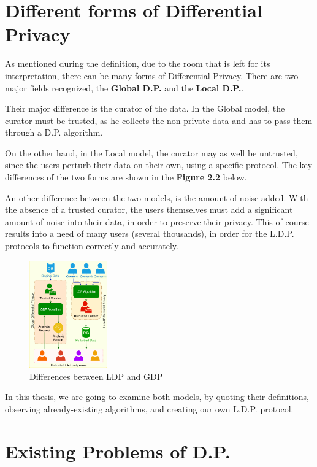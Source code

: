 \section{Different forms of Differential Privacy}

As mentioned during the definition, due to the room that is left for its interpretation, there can be many forms of Differential Privacy. There are two major fields recognized, the \textbf{Global D.P.} and the \textbf{Local D.P.}.

Their major difference is the curator of the data. In the Global model, the curator must be trusted, as he collects the non-private data and has to pass them through a D.P. algorithm.

On the other hand, in the Local model, the curator may as well be untrusted, since the users perturb their data on their own, using a specific protocol. The key differences of the two forms are shown in the \textbf{Figure 2.2} below.

An other difference between the two models, is the amount of noise added. With the absence of a trusted curator, the users themselves must add a significant amount of noise into their data, in order to preserve their privacy. This of course results into a need of many users (several thousands), in order for the L.D.P. protocols to function correctly and accurately.


\begin{figure}[!htb]\centering
      \includegraphics[width=0.3\textwidth]{images/local_vs_global.png}
  \caption{Differences between LDP and GDP}
\end{figure}

In this thesis, we are going to examine both models, by quoting their definitions, observing already-existing algorithms, and creating our own L.D.P. protocol.

\section{Existing Problems of D.P.}

